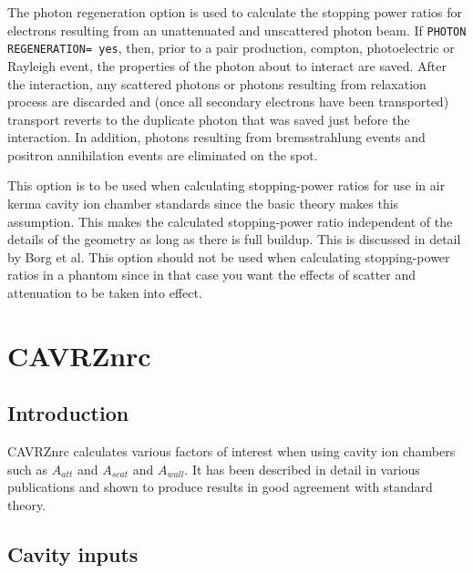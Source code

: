 \documentclass[12pt,twoside]{article}  %
\newcommand{\note}[1]{\mbox{}\\ \noindent \rule{16cm}{0.5mm} \\
{\em #1} \\ \noindent \rule{16cm}{0.5mm}\\
\typeout{******note: #1 *****}
}
\begin{document}
The photon regeneration option is used to calculate the stopping power ratios
for electrons resulting from an unattenuated and unscattered photon beam.
If {\tt PHOTON REGENERATION= yes}, then, prior to a pair production,
compton, photoelectric or Rayleigh event, the properties of the photon about
to interact are saved.  After the interaction, any scattered photons or
photons resulting from relaxation process are discarded and (once all
secondary electrons have been transported) transport reverts to the duplicate
photon that was saved just before the interaction.  In addition, photons
resulting from bremsstrahlung events and positron annihilation events are
eliminated on the spot.

This option is to be used when calculating stopping-power ratios for use
in air kerma cavity ion chamber standards since the basic theory makes this
assumption. This makes the calculated stopping-power ratio independent of
the details of the geometry as long as there is full buildup.  This is
discussed in detail by Borg et al\cite{Bo99a}.  This option should not be
used when calculating stopping-power ratios in a phantom since in that case
you want the effects of scatter and attenuation to be taken into effect.


\section{CAVRZnrc}
\renewcommand{\leftmark}{{CAVRZnrc}}

\subsection{Introduction}

CAVRZnrc calculates various factors of interest when using cavity ion
chambers such as $A_{att}$ and $A_{scat}$ and $A_{wall}$.
It has been described in detail in various
publications\cite{Bi85,Ro85a,RB90a,Bi90a} and shown to produce results in
good agreement with standard theory\cite{Bo99a}.

\subsection{Cavity inputs}
\end{document}
